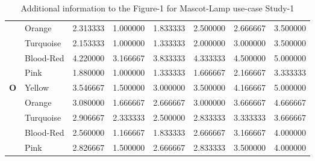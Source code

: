 \begin{table}[H]
\begin{center}
\begin{tabular}{ |p{0.5cm}| p{2cm}|p{1.5cm}|p{1.5cm}| p{1.5cm}|p{1.5cm}|p{1.5cm}| p{1.5cm}| }
&Orange & 2.313333 & 1.000000 &1.833333 &2.500000 &2.666667 &3.500000\\
&Turquoise & 2.153333 & 1.000000 &1.333333 &2.000000 &3.000000 &3.500000\\
&Blood-Red & 4.220000 & 3.166667 &3.833333 &4.333333 &4.500000 &5.000000\\
&Pink & 1.880000 & 1.000000 &1.333333 &1.666667 &2.166667 &3.333333\\
 \hline 
 \hline 
 \multirow{5}{*}{\textbf{O}} 
&Yellow & 3.546667 & 1.500000 &3.000000 &3.500000 &4.166667 &5.000000\\
&Orange & 3.080000 & 1.666667 &2.666667 &3.000000 &3.666667 &4.666667\\
&Turquoise & 2.906667 & 2.333333 &2.500000 &2.833333 &3.333333 &3.666667\\
&Blood-Red & 2.560000 & 1.166667 &1.833333 &2.666667 &3.166667 &4.000000\\
&Pink & 2.826667 & 1.500000 &2.666667 &2.833333 &3.500000 &4.000000\\
 \hline 
\end{tabular}
\end{center}
\caption{Additional information to the Figure-1 for Mascot-Lamp use-case Study-1}
\label{table:medianML1}
\end{table}

